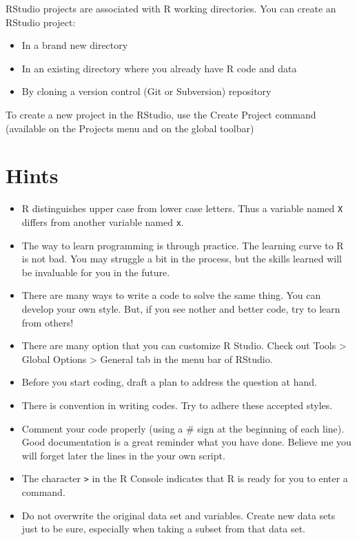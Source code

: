 \documentclass[
]{book}
\providecommand{\tightlist}{%
  \setlength{\itemsep}{0pt}\setlength{\parskip}{0pt}}
\theoremstyle{definition}
\theoremstyle{definition}
\theoremstyle{definition}
\theoremstyle{definition}
\theoremstyle{remark}
\begin{document}
RStudio projects are associated with R working directories. You can create an RStudio project:

\begin{itemize}
\tightlist
\item
  In a brand new directory
\item
  In an existing directory where you already have R code and data
\item
  By cloning a version control (Git or Subversion) repository
\end{itemize}

To create a new project in the RStudio, use the Create Project command (available on the Projects menu and on the global toolbar)

\hypertarget{hints}{%
\section{Hints}\label{hints}}

\begin{itemize}
\tightlist
\item
  R distinguishes upper case from lower case letters. Thus a variable named \texttt{X} differs from another variable named \texttt{x}.
\item
  The way to learn programming is through practice. The learning curve to R is not bad. You may struggle a bit in the process, but the skills learned will be invaluable for you in the future.
\item
  There are many ways to write a code to solve the same thing. You can develop your own style. But, if you see nother and better code, try to learn from others!
\item
  There are many option that you can customize R Studio. Check out Tools \textgreater{} Global Options \textgreater{} General tab in the menu bar of RStudio.
\item
  Before you start coding, draft a plan to address the question at hand.
\item
  There is convention in writing codes. Try to adhere these accepted styles.
\item
  Comment your code properly (using a \# sign at the beginning of each line). Good documentation is a great reminder what you have done. Believe me you will forget later the lines in the your own script.
\item
  The character \texttt{\textgreater{}} in the R Console indicates that R is ready for you to enter a command.\\
\item
  Do not overwrite the original data set and variables. Create new data sets just to be sure, especially when taking a subset from that data set.
\end{itemize}
\end{document}
